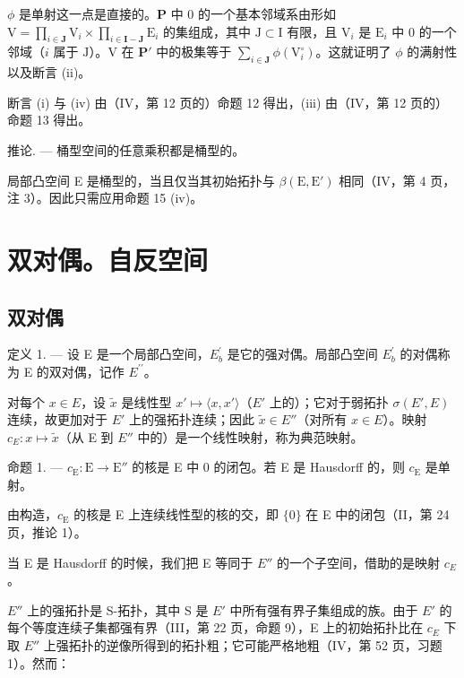 \(\phi\) 是单射这一点是直接的。\(\mathbf{P}\) 中 0 的一个基本邻域系由形如 \(\mathrm{V} = \prod_{i\in \mathbf{J}}\mathrm{V}_i\times \prod_{i\in \mathbf{I} - \mathbf{J}}\mathrm{E}_i\) 的集组成，其中 \(\mathrm{J}\subset \mathrm{I}\) 有限，且 \(\mathrm{V}_i\) 是 \(\mathrm{E}_i\) 中 0 的一个邻域（\(i\) 属于 \(\mathrm{J}\)）。\(\mathrm{V}\) 在 \(\mathbf{P}'\) 中的极集等于 \(\sum_{i\in \mathbf{J}}\phi (\mathrm{V}_i^\circ)\)。这就证明了 \(\phi\) 的满射性以及断言 (ii)。

断言 (i) 与 (iv) 由（IV，第 12 页的）命题 12 得出，(iii) 由（IV，第 12 页的）命题 13 得出。

推论. --- 桶型空间的任意乘积都是桶型的。

局部凸空间 E 是桶型的，当且仅当其初始拓扑与 \(\beta(\mathrm{E}, \mathrm{E}')\) 相同（IV，第 4 页，注 3）。因此只需应用命题 15 (iv)。

\section{双对偶。自反空间}

\subsection{双对偶}

定义 1. --- 设 E 是一个局部凸空间，\(E_{b}^{\prime}\) 是它的强对偶。局部凸空间 \(E_{b}^{\prime}\) 的对偶称为 E 的双对偶，记作 \(E^{\prime\prime}\)。

对每个 \(x \in E\)，设 \(\tilde{x}\) 是线性型 \(x' \mapsto \langle x, x' \rangle\)（\(E'\) 上的）；它对于弱拓扑 \(\sigma(E', E)\) 连续，故更加对于 \(E'\) 上的强拓扑连续；因此 \(\tilde{x} \in E''\)（对所有 \(x \in E\)）。映射 \(c_{E}: x \mapsto \tilde{x}\)（从 E 到 \(E''\) 中的）是一个线性映射，称为典范映射。

命题 1. --- \(c_{\mathrm{E}}: \mathrm{E} \to \mathrm{E}''\) 的核是 E 中 0 的闭包。若 E 是 Hausdorff 的，则 \(c_{\mathrm{E}}\) 是单射。

由构造，\(c_{\mathrm{E}}\) 的核是 E 上连续线性型的核的交，即 \(\{0\}\) 在 E 中的闭包（II，第 24 页，推论 1）。

当 E 是 Hausdorff 的时候，我们把 E 等同于 \(E''\) 的一个子空间，借助的是映射 \(c_{E}\)。

\(E''\) 上的强拓扑是 S-拓扑，其中 S 是 \(E'\) 中所有强有界子集组成的族。由于 \(E'\) 的每个等度连续子集都强有界（III，第 22 页，命题 9），E 上的初始拓扑比在 \(c_{E}\) 下取 \(E''\) 上强拓扑的逆像所得到的拓扑粗；它可能严格地粗（IV，第 52 页，习题 1）。然而：

